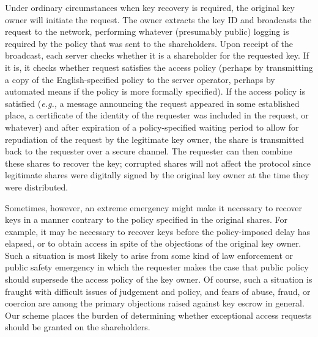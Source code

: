 Under ordinary circumstances when key recovery is required, the
original key owner will initiate the request.  The owner extracts the
key ID and broadcasts the request to the network, performing whatever
(presumably public) logging is required by the policy that was sent to
the shareholders.  Upon receipt of the broadcast, each server checks
whether it is a shareholder for the requested key.  If it is, it
checks whether request satisfies the access policy (perhaps by
transmitting a copy of the English-specified policy to the server
operator, perhaps by automated means if the policy is more formally
specified).  If the access policy is satisfied ({\em e.g.,} a message
announcing the request appeared in some established place, a
certificate of the identity of the requester was included in the
request, or whatever) and after expiration of a policy-specified
waiting period to allow for repudiation of the request by the
legitimate key owner, the share is transmitted back to the requester
over a secure channel.  The requester can then combine these shares to
recover the key; corrupted shares will not affect the protocol since
legitimate shares were digitally signed by the original key owner at
the time they were distributed.

Sometimes, however, an extreme emergency might make it necessary to
recover keys in a manner contrary to the policy specified in the
original shares.  For example, it may be necessary to recover keys
before the policy-imposed delay has elapsed, or to obtain access in
spite of the objections of the original key owner.  Such a situation
is most likely to arise from some kind of law enforcement or public
safety emergency in which the requester makes the case that public
policy should supersede the access policy of the key owner.  Of
course, such a situation is fraught with difficult issues of judgement
and policy, and fears of abuse, fraud, or coercion are among the
primary objections raised against key escrow in general.  Our scheme
places the burden of determining whether exceptional access requests
should be granted on the shareholders.

